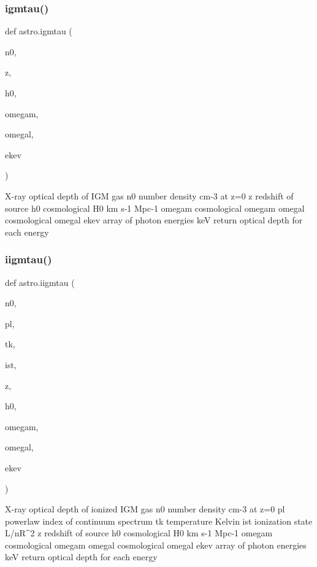 \subsubsection{\texorpdfstring{igmtau()}{igmtau()}}
{\footnotesize\ttfamily def astro.\+igmtau (\begin{DoxyParamCaption}\item[{}]{n0,  }\item[{}]{z,  }\item[{}]{h0,  }\item[{}]{omegam,  }\item[{}]{omegal,  }\item[{}]{ekev }\end{DoxyParamCaption})}

\begin{DoxyVerb}X-ray optical depth of IGM gas
    n0      number density cm-3 at z=0
    z       redshift of source
    h0      cosmological H0 km s-1 Mpc-1
    omegam  cosmological omegam
    omegal  cosmological omegal
    ekev    array of photon energies keV
return  optical depth for each energy
\end{DoxyVerb}
 \mbox{\label{namespaceastro_a6947448febcabe92f263054182b99ae7}} 
\subsubsection{\texorpdfstring{iigmtau()}{iigmtau()}}
{\footnotesize\ttfamily def astro.\+iigmtau (\begin{DoxyParamCaption}\item[{}]{n0,  }\item[{}]{pl,  }\item[{}]{tk,  }\item[{}]{ist,  }\item[{}]{z,  }\item[{}]{h0,  }\item[{}]{omegam,  }\item[{}]{omegal,  }\item[{}]{ekev }\end{DoxyParamCaption})}

\begin{DoxyVerb}X-ray optical depth of ionized IGM gas
    n0     number density cm-3 at z=0
    pl     powerlaw index of continuum spectrum
    tk     temperature Kelvin
    ist    ionization state L/nR^2
    z      redshift of source
    h0     cosmological H0 km s-1 Mpc-1
    omegam cosmological omegam
    omegal cosmological omegal
    ekev   array of photon energies keV
return optical depth for each energy
\end{DoxyVerb}
 \mbox{\label{namespaceastro_ae81a9bc5a1142a81996fcb0c71e1996a}} 
